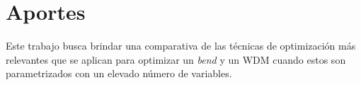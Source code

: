 \section{Aportes}

Este trabajo busca brindar una comparativa de las técnicas de optimización más relevantes que se aplican para optimizar un \emph{bend} y un WDM cuando estos son parametrizados con un elevado número de variables.

